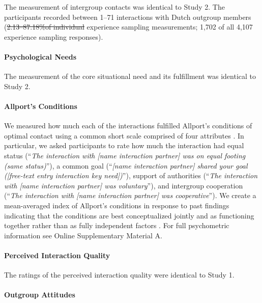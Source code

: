 \documentclass[man, 12pt, a4paper, mask]{apa7}
\theoremstyle{break}
\theoremstyle{plain}
\providecommand{\DIFaddtex}[1]{{\protect\color{blue}\uwave{#1}}} %
\providecommand{\DIFdeltex}[1]{{\protect\color{red}\sout{#1}}}                      %
\providecommand{\DIFaddbegin}{} %
\providecommand{\DIFaddend}{} %
\providecommand{\DIFdelbegin}{} %
\providecommand{\DIFdelend}{} %
\providecommand{\DIFadd}[1]{\texorpdfstring{\DIFaddtex{#1}}{#1}} %
\providecommand{\DIFdel}[1]{\texorpdfstring{\DIFdeltex{#1}}{}} %
\newcommand{\DIFscaledelfig}{0.5}
\newlength{\DIFdelgraphicswidth} %
\newlength{\DIFdelgraphicsheight} %
\newcommand{\DIFaddincludegraphics}[2][]{{\color{blue}\fbox{\DIFOincludegraphics[#1]{#2}}}} %
\newcommand{\DIFdelincludegraphics}[2][]{%
\sbox{\DIFdelgraphicsbox}{\DIFOincludegraphics[#1]{#2}}%
\settoboxwidth{\DIFdelgraphicswidth}{\DIFdelgraphicsbox} %
\settoboxtotalheight{\DIFdelgraphicsheight}{\DIFdelgraphicsbox} %
\scalebox{\DIFscaledelfig}{%
\parbox[b]{\DIFdelgraphicswidth}{\usebox{\DIFdelgraphicsbox}\\[-\baselineskip] \rule{\DIFdelgraphicswidth}{0em}}\llap{\resizebox{\DIFdelgraphicswidth}{\DIFdelgraphicsheight}{%
\setlength{\unitlength}{\DIFdelgraphicswidth}%
\begin{picture}(1,1)%
\thicklines\linethickness{2pt} %
{\color[rgb]{1,0,0}\put(0,0){\framebox(1,1){}}}%
{\color[rgb]{1,0,0}\put(0,0){\line( 1,1){1}}}%
{\color[rgb]{1,0,0}\put(0,1){\line(1,-1){1}}}%
\end{picture}%
}\hspace*{3pt}}} %
} %
\DeclareRobustCommand{\DIFaddbegin}{\DIFOaddbegin \let\includegraphics\DIFaddincludegraphics} %
\DeclareRobustCommand{\DIFaddend}{\DIFOaddend \let\includegraphics\DIFOincludegraphics} %
\DeclareRobustCommand{\DIFdelbegin}{\DIFOdelbegin \let\includegraphics\DIFdelincludegraphics} %
\DeclareRobustCommand{\DIFdelend}{\DIFOaddend \let\includegraphics\DIFOincludegraphics} %
\begin{document}
The measurement of intergroup contacts was identical to Study 2. The
participants recorded between 1--71 interactions with Dutch outgroup
members (\DIFdelbegin \DIFdel{2.13--87.18\%of individual }\DIFdelend \DIFaddbegin \DIFadd{\(M\) = 42.22\%, \(SD\) = 19.96\% of the individuals'
}\DIFaddend experience sampling measurements; 1,702 of all 4,107 experience sampling
responses).

\paragraph{Psychological Needs}

The measurement of the core situational need and its fulfillment was
identical to Study 2.

\paragraph{Allport's Conditions}

We measured how much each of the interactions fulfilled Allport's
conditions of optimal contact using a common short scale comprised of
four attributes \citep{Islam1993, Voci2003, AlRamiah2012a}. In
particular, we asked participants to rate how much the interaction had
equal status
(``\textit{The interaction with [name interaction partner] was on equal footing (same status)}''),
a common goal
(``\textit{[name interaction partner] shared your goal ([free-text entry interaction key need])}''),
support of authorities
(``\textit{The interaction with [name interaction partner] was voluntary}''),
and intergroup cooperation
(``\textit{The interaction with [name interaction partner] was cooperative}'').
We create a mean-averaged index of Allport's conditions in response to
past findings indicating that the conditions are best conceptualized
jointly and as functioning together rather than as fully independent
factors \citep[][, p. 766]{Pettigrew2006}. For full psychometric
information see Online Supplementary Material A.

\paragraph{Perceived Interaction Quality}

The ratings of the perceived interaction quality were identical to Study
1.

\paragraph{Outgroup Attitudes}
\end{document}
